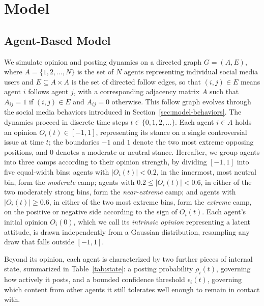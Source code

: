 \documentclass{svproc}
\def\post{\rho}                 %
\def\BoundedConfidence{\epsilon} %
\def\Stubbornness{\mu}           %
\begin{document}
\section{Model}\label{sec:model}

\subsection{Agent-Based Model}\label{sec:model-abm}

We simulate opinion and posting dynamics on a directed 
graph $G=(A,E)$, where $A=\{1,2,\dots,N\}$ is the set 
of $N$ agents representing individual social media 
users and $E\subseteq A\times A$ is the set of 
directed follow edges, so that $(i,j)\in E$ means
agent $i$ follows agent $j$, with a corresponding
adjacency matrix $A$ such that
$A_{ij}=1$ if $(i,j)\in E$ and $A_{ij}=0$ otherwise.
This follow graph evolves through the social media
behaviors introduced in
Section~\ref{sec:model-behaviors}.
The dynamics proceed in discrete time 
steps $t\in\{0,1,2,\dots\}$.
Each agent $i\in A$ holds an opinion $O_i(t)\in[-1,1]$,
representing its stance on a single controversial
issue at time $t$; the boundaries $-1$ and $1$
denote the two most extreme opposing positions,
and $0$ denotes a moderate or neutral stance.
Hereafter, we group agents into three
camps according to their opinion strength, by
dividing $[-1,1]$ into five equal-width bins:
agents with $|O_i(t)|<0.2$, in the innermost,
most neutral bin, form the \emph{moderate} camp;
agents with $0.2\le|O_i(t)|<0.6$, in either of the
two moderately strong bins, form the
\emph{near-extreme} camp; and agents with
$|O_i(t)|\ge0.6$, in either of the two most extreme
bins, form the \emph{extreme} camp, on the
positive or negative side according to the sign
of $O_i(t)$.
Each agent's initial opinion $O_i(0)$, which we 
call its \emph{intrinsic opinion} 
representing a latent attitude, is drawn independently 
from a Gaussian distribution, resampling any draw 
that falls outside $[-1,1]$.

Beyond its opinion, each agent is characterized by
two further pieces of internal state, summarized
in Table~\ref{tab:state}: a posting probability
$\post_i(t)$, governing how actively it posts, and
a bounded confidence threshold
$\BoundedConfidence_i(t)$, governing which content
from other agents it still tolerates well enough
to remain in contact with.
\end{document}
